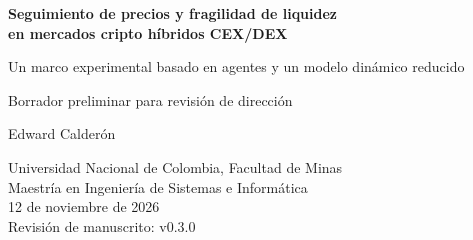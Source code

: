 \documentclass[10pt,a4paper]{article}
\newcommand{\revisionManuscrito}{v0.3.0}
\begin{document}
\begin{center}
  {\LARGE\bfseries Seguimiento de precios y fragilidad de liquidez\\
  en mercados cripto híbridos CEX/DEX\par}
  \vspace{0.35em}
  {\large Un marco experimental basado en agentes y un modelo dinámico reducido\par}
  \vspace{0.35em}
  {\normalsize Borrador preliminar para revisión de dirección\par}
  \vspace{0.8em}
  {\large Edward Calderón\par}
  Universidad Nacional de Colombia, Facultad de Minas\\
  Maestría en Ingeniería de Sistemas e Informática\\
  12 de noviembre de 2026\\
  {\small Revisión de manuscrito: \revisionManuscrito}
\end{center}







\appendix


\clearpage
\renewcommand{\refname}{Referencias}


\end{document}
